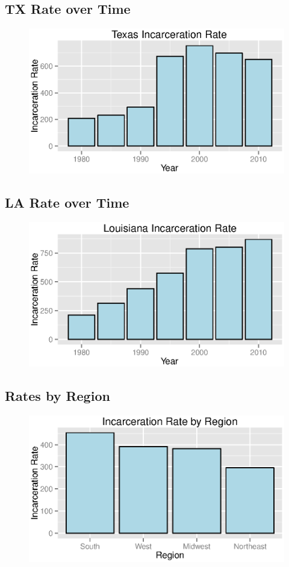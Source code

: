 \documentclass{exam}
\begin{document}
  \subsection{TX Rate over Time}
  \begin{figure}[H]
    \centering
    \includegraphics[scale = 0.9]{tx_rate.eps}
  \end{figure}

  \subsection{LA Rate over Time}
  \begin{figure}[H]
    \centering
    \includegraphics[scale = 0.9]{la_rate.eps}
  \end{figure}

  \subsection{Rates by Region}
  \begin{figure}[H]
    \centering
    \includegraphics[scale = 0.9]{rate_by_region.eps}
  \end{figure}
\end{document}
